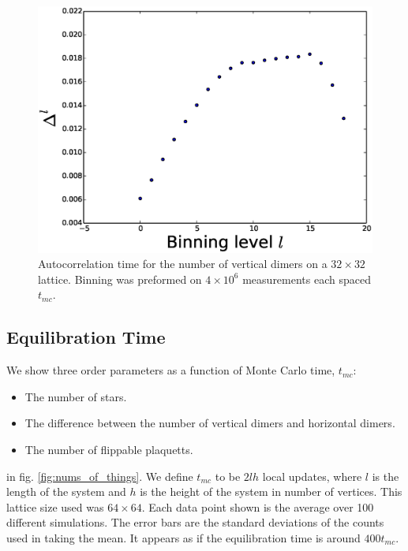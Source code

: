\documentclass[aps,floatfix,11pt]{revtex4-1}
\begin{document}
\begin{figure}[h]
    \centering
    \includegraphics[width=8.5 cm]{auto_cor_num_vert}
    \caption{Autocorrelation time for the number of vertical dimers on a $32\times 32$ lattice. Binning was preformed on $4\times 10^6$
    measurements each spaced $t_{mc}$. \label{fig:auto_cor_num_stars}}
\end{figure}

\clearpage
\subsection{Equilibration Time}

We show three order parameters as a function of Monte Carlo time, $t_{mc}$: 

\begin{itemize}
    \item The number of stars.
    \item The difference between the number of vertical dimers and horizontal dimers.
    \item The number of flippable plaquetts.
\end{itemize}

\noindent
in fig. \ref{fig:nums_of_things}. We define $t_{mc}$ to be $2lh$ local updates, where $l$ is the length of the system and $h$ is the
height of the system in number of vertices. This lattice size used was $64\times 64$. Each data
point shown is the average over 100 different simulations. The error bars are the standard deviations of
the counts used in taking the mean. It appears as if the equilibration time is around $400t_{mc}$. 
\end{document}
